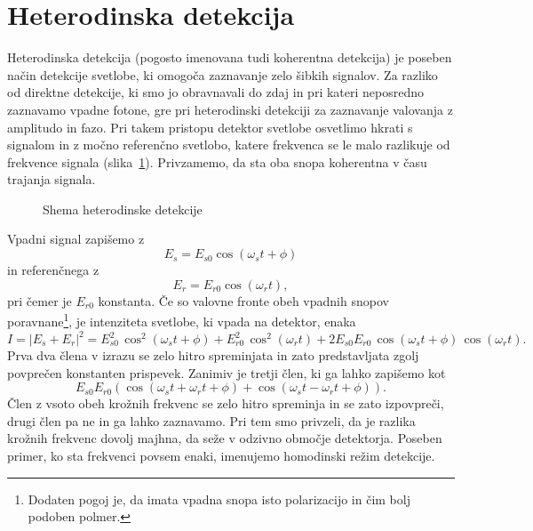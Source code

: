 \section{Heterodinska detekcija}
Heterodinska detekcija (pogosto imenovana tudi koherentna detekcija) je poseben način
detekcije svetlobe, ki omogoča zaznavanje zelo šibkih signalov. Za razliko od direktne detekcije,
ki smo jo obravnavali do zdaj in pri kateri neposredno zaznavamo vpadne fotone, 
gre pri heterodinski detekciji za zaznavanje valovanja z amplitudo in fazo. Pri takem 
pristopu detektor svetlobe osvetlimo hkrati s signalom in z močno referenčno svetlobo, 
katere frekvenca se le malo razlikuje od frekvence signala (slika~\ref{11_Hetero}). 
Privzamemo, da sta oba snopa 
koherentna v času trajanja signala.
\begin{figure}[h]
\centering
\def\svgwidth{80truemm} 

\caption{Shema heterodinske detekcije}
\label{11_Hetero}
\end{figure}

Vpadni signal zapišemo z
\begin{equation}
E_s = E_{s0} \cos(\omega_st+\phi)
\end{equation}
in referenčnega z
\begin{equation}
E_r = E_{r0} \cos(\omega_rt),
\end{equation}
pri čemer je $E_{r0}$ konstanta. Če so valovne fronte obeh vpadnih snopov 
poravnane\footnote{Dodaten pogoj je, da imata vpadna snopa isto polarizacijo in čim bolj 
podoben polmer.}, je intenziteta svetlobe, 
ki vpada na detektor, enaka
\begin{equation}
I = |E_s+E_r|^2 = E_{s0}^2 \, \cos^2(\omega_st+\phi)+
E_{r0}^2 \, \cos^2(\omega_rt) + 2E_{s0}E_{r0}\, \cos(\omega_st+\phi)\, \cos(\omega_rt).
\end{equation}
Prva dva člena v izrazu se zelo hitro spreminjata in zato predstavljata zgolj 
povprečen konstanten prispevek. 
Zanimiv je tretji člen, ki ga lahko zapišemo
kot
\begin{equation}
E_{s0}E_{r0}\left( \cos(\omega_st+\omega_rt+\phi)+\cos(\omega_st-\omega_rt+\phi)\right).
\end{equation}
Člen z vsoto obeh krožnih frekvenc se zelo hitro spreminja in se zato izpovpreči, 
drugi člen pa ne in ga lahko zaznavamo. 
Pri tem smo privzeli, da je razlika krožnih frekvenc dovolj majhna, da seže v odzivno območje
detektorja. Poseben primer, ko sta frekvenci povsem enaki, imenujemo homodinski režim 
detekcije. 

